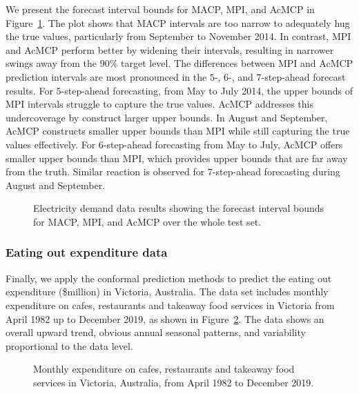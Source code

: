 \documentclass[
  11pt,
  a4paper,
]{article}
\theoremstyle{plain}
\theoremstyle{remark}
\begin{document}
We present the forecast interval bounds for MACP, MPI, and AcMCP in
Figure~\ref{fig-elec_timeplot}. The plot shows that MACP intervals are
too narrow to adequately hug the true values, particularly from
September to November 2014. In contrast, MPI and AcMCP perform better by
widening their intervals, resulting in narrower swings away from the
\(90\%\) target level. The differences between MPI and AcMCP prediction
intervals are most pronounced in the \(5\)-, \(6\)-, and
\(7\)-step-ahead forecast results. For \(5\)-step-ahead forecasting,
from May to July 2014, the upper bounds of MPI intervals struggle to
capture the true values. AcMCP addresses this undercoverage by construct
larger upper bounds. In August and September, AcMCP constructs smaller
upper bounds than MPI while still capturing the true values effectively.
For \(6\)-step-ahead forecasting from May to July, AcMCP offers smaller
upper bounds than MPI, which provides upper bounds that are far away
from the truth. Similar reaction is observed for \(7\)-step-ahead
forecasting during August and September.

\begin{figure}


\caption{\label{fig-elec_timeplot}Electricity demand data results
showing the forecast interval bounds for MACP, MPI, and AcMCP over the
whole test set.}

\end{figure}%

\subsubsection{Eating out expenditure
data}\label{eating-out-expenditure-data}

Finally, we apply the conformal prediction methods to predict the eating
out expenditure (\$million) in Victoria, Australia. The data set
includes monthly expenditure on cafes, restaurants and takeaway food
services in Victoria from April 1982 up to December 2019, as shown in
Figure~\ref{fig-cafe_data}. The data shows an overall upward trend,
obvious annual seasonal patterns, and variability proportional to the
data level.

\begin{figure}


\caption{\label{fig-cafe_data}Monthly expenditure on cafes, restaurants
and takeaway food services in Victoria, Australia, from April 1982 to
December 2019.}

\end{figure}%
\end{document}
